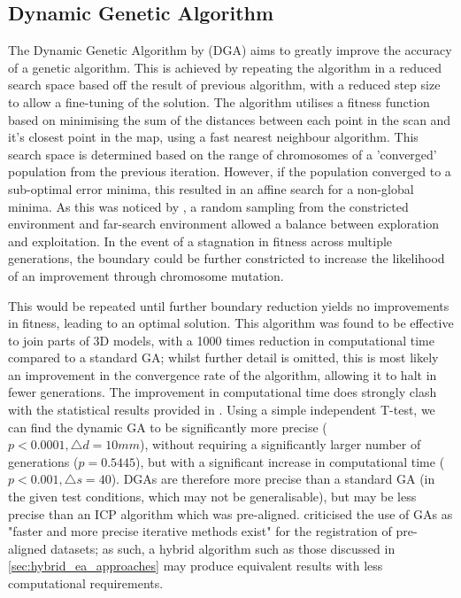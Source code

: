 \documentclass[authoryearcitations]{UoYCSproject}
\begin{document}
\subsection{Dynamic Genetic Algorithm}
The Dynamic Genetic Algorithm by \citet{Chow2004-xc} (DGA) aims to greatly improve the accuracy of a genetic algorithm. This is achieved by repeating the algorithm in a reduced search space based off the result of previous algorithm, with a reduced step size to allow a fine-tuning of the solution. The algorithm utilises a fitness function based on minimising the sum of the distances between each point in the scan and it's closest point in the map, using a fast nearest neighbour algorithm. This search space is determined based on the range of chromosomes of a 'converged' population from the previous iteration. However, if the population converged to a sub-optimal error minima, this resulted in an affine search for a non-global minima. As this was noticed by \citeauthor{Chow2004-xc}, a random sampling from the constricted environment and far-search environment allowed a balance between exploration and exploitation. In the event of a stagnation in fitness across multiple generations, the boundary could be further constricted to increase the likelihood of an improvement through chromosome mutation. \newline

This would be repeated until further boundary reduction yields no improvements in fitness, leading to an optimal solution. This algorithm was found to be effective to join parts of 3D models, with a 1000 times reduction in computational time compared to a standard GA; whilst further detail is omitted, this is most likely an improvement in the convergence rate of the algorithm, allowing it to halt in fewer generations. The improvement in computational time does strongly clash with the statistical results provided in \cite{Chow2004-xc}. Using a simple independent T-test, we can find the dynamic GA to be significantly more precise ($p<0.0001, \triangle d = 10mm$), without requiring a significantly larger number of generations ($p=0.5445$), but with a significant increase in computational time ($p<0.001, \triangle s = 40$). DGAs are therefore more precise than a standard GA (in the given test conditions, which may not be generalisable), but may be less precise than an ICP algorithm which was pre-aligned. \citet{Lomonosov2006-vq} criticised the use of GAs as "faster and more precise iterative methods exist" for the registration of pre-aligned datasets; as such, a hybrid algorithm such as those discussed in \autoref{sec:hybrid_ea_approaches} may produce equivalent results with less computational requirements.
\end{document}
